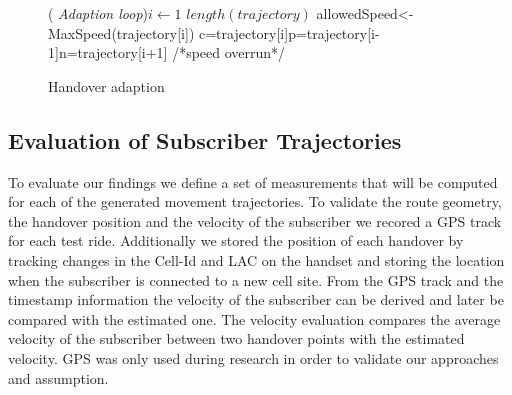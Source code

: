 \begin{figure}[!t]
	\removelatexerror
	\begin{algorithm}[H]
		\caption{Handover adaption}
		\label{alg:adaption}
		\For( \emph{Adaption loop}){$i\leftarrow 1$ \KwTo $length(trajectory)$}
		{
			allowedSpeed<-MaxSpeed(trajectory[i])\;
			c=trajectory[i]\;p=trajectory[i-1]\;n=trajectory[i+1]\;
			/*speed overrun*/\\
		}
	\end{algorithm}
\end{figure}


\subsection{Evaluation of Subscriber Trajectories}
To evaluate our findings we define a set of measurements that will be computed for each of the generated movement trajectories. To validate the route geometry, the handover position and the velocity of the subscriber we recored a GPS track for each test ride. Additionally we stored the position of each handover by tracking changes in the Cell-Id and LAC on the handset and storing the location when the subscriber is connected to a new cell site. From the GPS track and the timestamp information the velocity of the subscriber can be derived and later be compared with the estimated one. The velocity evaluation compares  the average velocity of the subscriber between two handover points with the estimated velocity. GPS was only used during research in order to validate our approaches and assumption.

